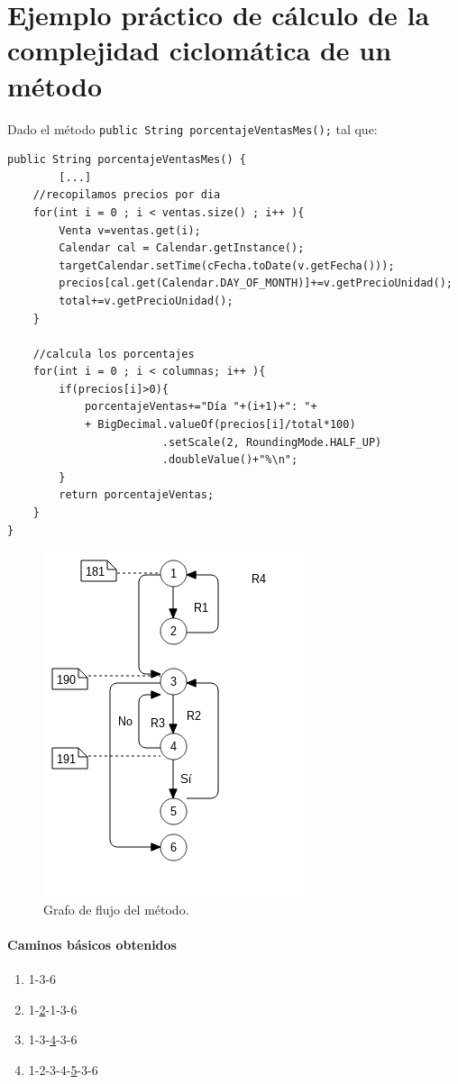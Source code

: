 \newpage
\section{Ejemplo práctico de cálculo de la complejidad ciclomática de un método}
Dado el método  \texttt{public String porcentajeVentasMes();} tal que: 
\begin{verbatim}
public String porcentajeVentasMes() {
	    [...]
	//recopilamos precios por dia
    for(int i = 0 ; i < ventas.size() ; i++ ){
        Venta v=ventas.get(i);
        Calendar cal = Calendar.getInstance();
        targetCalendar.setTime(cFecha.toDate(v.getFecha()));
        precios[cal.get(Calendar.DAY_OF_MONTH)]+=v.getPrecioUnidad();
        total+=v.getPrecioUnidad();
    }

    //calcula los porcentajes
    for(int i = 0 ; i < columnas; i++ ){
        if(precios[i]>0){
        	porcentajeVentas+="Día "+(i+1)+": "+
        	+ BigDecimal.valueOf(precios[i]/total*100)
        		        .setScale(2, RoundingMode.HALF_UP)
        		        .doubleValue()+"%\n";
        }
        return porcentajeVentas;
    }
}   
\end{verbatim}

\begin{figure}[H]
  \centering
  \includegraphics[width=0.4\linewidth]{Resources/porcentajeVentasMes}
  \caption{Grafo de flujo del método.}
  \label{fig:joder}
\end{figure}
\newpage
\paragraph{Caminos básicos obtenidos}
    \begin{enumerate}
        \item 1-3-6
        \item 1-\underline{2}-1-3-6
        \item 1-3-\underline{4}-3-6
        \item 1-2-3-4-\underline{5}-3-6
    \end{enumerate}

